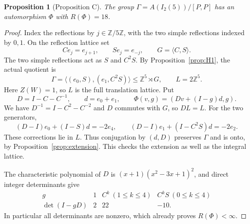 \documentclass[11pt]{amsart}
\newtheorem{proposition}[theorem]{Proposition}
\theoremstyle{definition}
\newcommand{\Z}{\mathbb{Z}}
\begin{document}
\begin{proposition}[Proposition C]\label{prop:dihedral-counterexample}
The group $\Gamma=A(I_2(5))/[P,P]$ has an automorphism $\Phi$ with $R(\Phi)=18$.
\end{proposition}
\begin{proof}
Index the reflections by $j\in\Z/5\Z$, with the two simple reflections indexed by $0,1$.
On the reflection lattice set
\[
 Ce_j=e_{j+1},\qquad Se_j=e_{-j},\qquad G=\langle C,S\rangle.
\]
The two simple reflections act as $S$ and $C^2S$. By Proposition~\ref{prop:H1}, the actual quotient is
\[
 \Gamma=\langle(e_0,S),(e_1,C^2S)\rangle\le\Z^5\rtimes G,
 \qquad L=2\Z^5.
\]
Here $Z(W)=1$, so $L$ is the full translation lattice. Put
\[
 D=I-C-C^{-1},\qquad d=e_0+e_1,\qquad
 \Phi(v,g)=(Dv+(I-g)d,g).
\]
We have $D^{-1}=I-C^2-C^{-2}$ and $D$ commutes with $G$, so $DL=L$. For the two generators,
\[
 (D-I)e_0+(I-S)d=-2e_4,\qquad
 (D-I)e_1+(I-C^2S)d=-2e_2.
\]
These corrections lie in $L$. Thus conjugation by $(d,D)$ preserves $\Gamma$ and is onto, by
Proposition~\ref{prop:extension}. This checks the extension as well as the integral lattice.

The characteristic polynomial of $D$ is $(x+1)(x^2-3x+1)^2$, and direct integer determinants give
\[
\begin{array}{c|ccc}
 g&1&C^k\ (1\le k\le4)&C^kS\ (0\le k\le4)\\ \hline
 \det(I-gD)&2&22&-10.
\end{array}
\]
In particular all determinants are nonzero, which already proves $R(\Phi)<\infty$.


\end{proof}
\end{document}
